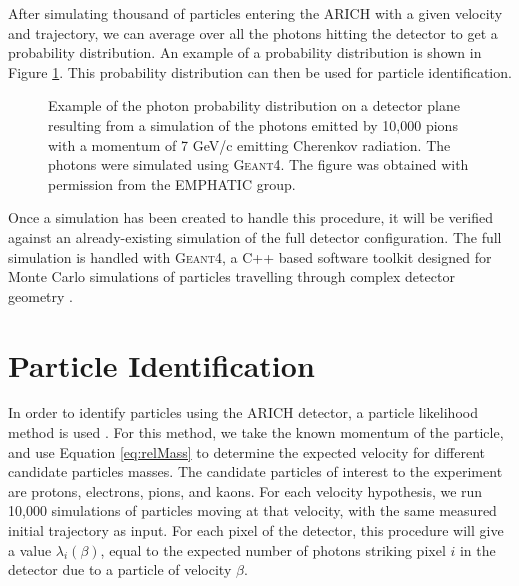 After simulating thousand of particles entering the \ac{ARICH} with a given velocity and trajectory, we can average over all the photons hitting the detector to get a probability distribution.
An example of a probability distribution is shown in Figure \ref{fig:particleRings}.
This probability distribution can then be used for particle identification.

\begin{figure}[h!]
\centering
{}
\caption[Example of a simulated photon probability distribution]{Example of the photon probability distribution on a detector plane resulting from a simulation of the photons emitted by 10,000 pions with a momentum of 7 GeV/c emitting Cherenkov radiation. The photons were simulated using \textsc{Geant4}. The figure was obtained with permission from the \textsc{EMPHATIC} group.}

\label{fig:particleRings}       %
\end{figure}

Once a simulation has been created to handle this procedure, it will be verified against an already-existing simulation of the full detector configuration.
The full simulation is handled with \textsc{Geant4}, a C++ based software toolkit designed for Monte Carlo simulations of particles travelling through complex detector geometry  \cite{geant4}.

\section{Particle Identification}
\label{sec:particleIdentification}
In order to identify particles using the \ac{ARICH} detector, a particle likelihood method is used \cite{richImpact, belleArich}.
For this method, we take the known momentum of the particle, and use Equation \ref{eq:relMass} to determine the expected velocity for different candidate particles masses.
The candidate particles of interest to the experiment are protons, electrons, pions, and kaons.
For each velocity hypothesis, we run 10,000 simulations of particles moving at that velocity, with the same measured initial trajectory as input.
For each pixel of the detector, this procedure will give a value $\lambda_i(\beta)$, equal to the expected number of photons striking pixel $i$ in the detector due to a particle of velocity $\beta$. 

